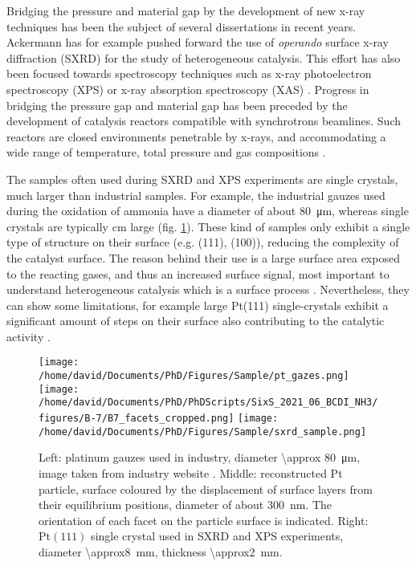 Bridging the pressure and material gap by the development of new x-ray techniques has been the subject of several dissertations in recent years.
Ackermann \parencite*{Ackermann2007} has for example pushed forward the use of \textit{operando} surface x-ray diffraction (SXRD) for the study of heterogeneous catalysis.
This effort has also been focused towards spectroscopy techniques such as x-ray photoelectron spectroscopy (XPS) or x-ray absorption spectroscopy (XAS) \parencite{Dann2019}.
Progress in bridging the pressure gap and material gap has been preceded by the development of catalysis reactors compatible with synchrotrons beamlines.
Such reactors are closed environments penetrable by x-rays, and accommodating a wide range of temperature, total pressure and gas compositions \parencite{VanRijn2010, Richard2017, CastanGuerrero2018}.

The samples often used during SXRD and XPS experiments are single crystals, much larger than industrial samples.
For example, the industrial gauzes used during the oxidation of ammonia have a diameter of about \qty{80}{\um}, whereas single crystals are typically \unit{\cm} large (fig. \ref{fig:SamplesIntro}).
These kind of samples only exhibit a single type of structure on their surface (e.g. (111), (100)), reducing the complexity of the catalyst surface.
The reason behind their use is a large surface area exposed to the reacting gases, and thus an increased surface signal, most important to understand heterogeneous catalysis which is a surface process \parencite{Goodman1994}.
Nevertheless, they can show some limitations, for example large Pt(111) single-crystals exhibit a significant amount of steps on their surface also contributing to the catalytic activity \parencite{CalleVallejo2017}.

\begin{figure}[!htb]
    \centering
    \texttt{[image: /home/david/Documents/PhD/Figures/Sample/pt\_gazes.png]}
    \texttt{[image: /home/david/Documents/PhD/PhDScripts/SixS\_2021\_06\_BCDI\_NH3/figures/B-7/B7\_facets\_cropped.png]}
    \texttt{[image: /home/david/Documents/PhD/Figures/Sample/sxrd\_sample.png]}
    \caption{
    Left: platinum gauzes used in industry, diameter \qty{\approx 80}{\um}, image taken from industry website \parencite{PtRhGauze}.
    Middle: reconstructed Pt particle, surface coloured by the displacement of surface layers from their equilibrium positions, diameter of about \qty{300}{\nm}.
    The orientation of each facet on the particle surface is indicated.
    Right: Pt$(111)$ single crystal used in SXRD and XPS experiments, diameter \qty{\approx8}{\mm}, thickness \qty{\approx2}{\mm}.
    }
    \label{fig:SamplesIntro}
\end{figure}

